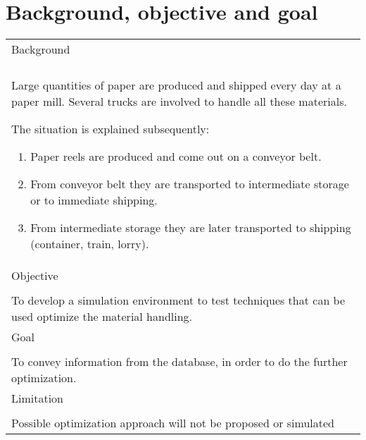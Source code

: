 \documentclass{report}
\begin{document}
\section{Background, objective and goal}
\begin{table}[h]
\begin{tabular}{| p{12cm} |}

	\hline
	Background \\
	\\
	Large quantities of paper are produced and shipped every day at a paper mill. Several trucks are involved to handle all these materials. 

	The situation is explained subsequently:
	\begin{enumerate}
	\item
	Paper reels are produced and come out on a conveyor belt.
	\item
	From conveyor belt they are transported to intermediate storage or to immediate shipping.
	\item
	From intermediate storage they are later transported to shipping (container, train, lorry).
	\end{enumerate}
		\\

	\hline
		Objective \\
		\\
		To develop a simulation environment to test techniques that can be used optimize the material handling. \\
	
	\hline
		Goal \\
		\\
		To convey information from the database, in order to do the further optimization.\\

	\hline
		Limitation \\
		\\
		Possible optimization approach will not be proposed or simulated \\

	\hline

\end{tabular}
\end{table}
\end{document}
